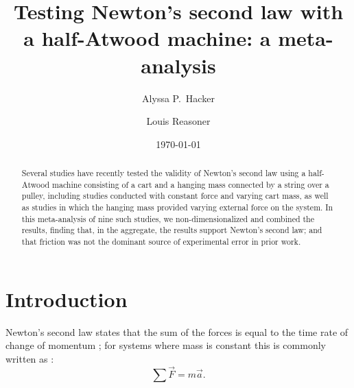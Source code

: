 \documentclass[reprint,amsmath,amssymb,aps,twoside]{revtex4-2}
\begin{document}
\setcounter{page}{33}
\title{Testing Newton's second law with a half-Atwood machine: a meta-analysis}

\author{Alyssa P.~Hacker}
\author{Louis Reasoner}
\date{\today}

\begin{abstract}
Several studies have recently tested the validity of Newton's second law using a half-Atwood machine consisting of a cart and a hanging mass connected by a string over a pulley, including studies conducted with constant force and varying cart mass, as well as studies in which the hanging mass provided varying external force on the system. In this meta-analysis of nine such studies, we non-dimensionalized and combined the results, finding that, in the aggregate, the results support Newton's second law; and that friction was not the dominant source of experimental error in prior work. 
\end{abstract}


\maketitle\thispagestyle{mytitlepage}





\section{Introduction}
Newton's second law states that the sum of the forces is equal to the time rate of change of momentum \cite{newton1687principia}; for systems where mass is constant this is commonly written as \cite{tipler, barrons}:
\begin{equation}
\sum\vec{F} = m\vec{a}.
\label{eq:n2l}
\end{equation}
\end{document}
